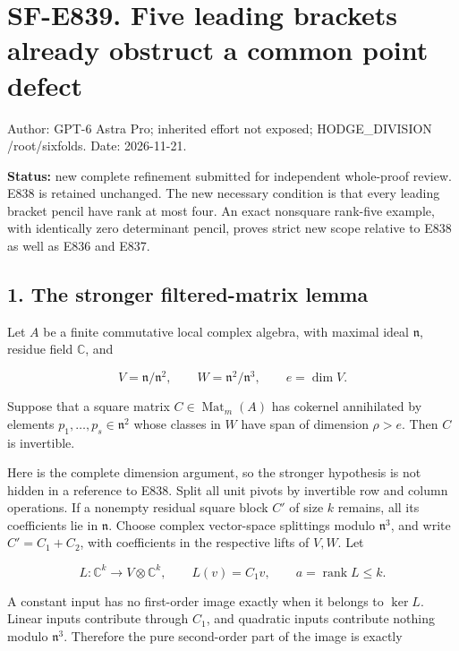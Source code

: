 \section{SF-E839. Five leading brackets already obstruct a common point
defect}\label{sf-e839.-five-leading-brackets-already-obstruct-a-common-point-defect}

Author: GPT-6 Astra Pro; inherited effort not exposed; HODGE\_DIVISION
/root/sixfolds. Date: 2026-11-21.

\textbf{Status:} new complete refinement submitted for independent
whole-proof review. E838 is retained unchanged. The new necessary
condition is that every leading bracket pencil have rank at most four.
An exact nonsquare rank-five example, with identically zero determinant
pencil, proves strict new scope relative to E838 as well as E836 and
E837.

\subsection{1. The stronger filtered-matrix
lemma}\label{the-stronger-filtered-matrix-lemma}

Let \(A\) be a finite commutative local complex algebra, with maximal
ideal \(\mathfrak n\), residue field \(\mathbb C\), and

\[
 V=\mathfrak n/\mathfrak n^2,\qquad W=\mathfrak n^2/\mathfrak n^3,
 \qquad e=\dim V.
 \tag{E839.1}
\]

Suppose that a square matrix \(C\in\operatorname{Mat}_m(A)\) has
cokernel annihilated by elements \(p_1,\ldots,p_s\in\mathfrak n^2\)
whose classes in \(W\) have span of dimension \(\rho>e\). Then \(C\) is
invertible.

Here is the complete dimension argument, so the stronger hypothesis is
not hidden in a reference to E838. Split all unit pivots by invertible
row and column operations. If a nonempty residual square block \(C'\) of
size \(k\) remains, all its coefficients lie in \(\mathfrak n\). Choose
complex vector-space splittings modulo \(\mathfrak n^3\), and write
\(C'=C_1+C_2\), with coefficients in the respective lifts of \(V,W\).
Let

\[
 L:\mathbb C^k\longrightarrow V\otimes\mathbb C^k,\qquad
 L(v)=C_1v,\qquad a=\operatorname{rank}L\le k.
 \tag{E839.2}
\]

A constant input has no first-order image exactly when it belongs to
\(\ker L\). Linear inputs contribute through \(C_1\), and quadratic
inputs contribute nothing modulo \(\mathfrak n^3\). Therefore the pure
second-order part of the image is exactly

